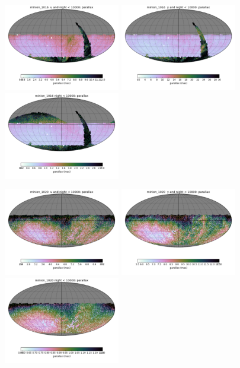 \begin{figure}[ht]
  \begin{center}
  \includegraphics[width=2.0in]{./figs/milkyway/astromPanels/MW_Astrom_paError_Baseline_u_map.png}
  \includegraphics[width=2.0in]{./figs/milkyway/astromPanels/MW_Astrom_paError_Baseline_y_map.png}
  \includegraphics[width=2.0in]{./figs/milkyway/astromPanels/MW_Astrom_paError_Baseline_10y_map.png}
  \end{center}
  \begin{center}
  \includegraphics[width=2.0in]{./figs/milkyway/astromPanels/MW_Astrom_paError_PanSTARRS_u_map.png}
  \includegraphics[width=2.0in]{./figs/milkyway/astromPanels/MW_Astrom_paError_PanSTARRS_y_map.png}
  \includegraphics[width=2.0in]{./figs/milkyway/astromPanels/MW_Astrom_paError_PanSTARRS_10y_map.png}
  \end{center}


\end{figure}
